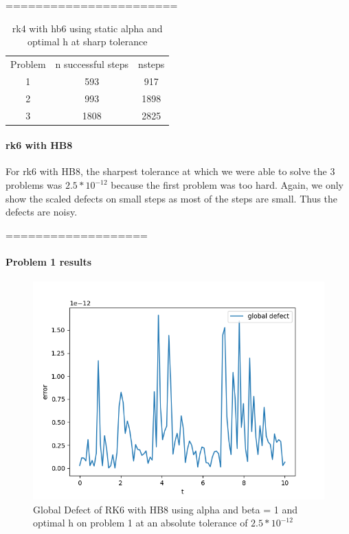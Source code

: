 \documentclass{article}
\begin{document}
=======================
\begin{table}[h]
\caption {rk4 with hb6 using static alpha and optimal h at sharp tolerance} \label{tab:rk4_with_hb6_sharp_tolerance}
\begin{center}
\begin{tabular}{ c c c } 
Problem & n successful steps      &       nsteps \\ 
1       & 593                     &        917              \\ 
2       & 993                     &        1898             \\
3       & 1808                    &        2825             \\
\end{tabular}
\end{center}
\end{table}	


\paragraph{rk6 with HB8}
For rk6 with HB8, the sharpest tolerance at which we were able to solve the 3 problems was $2.5*10^{-12}$ because the first problem was too hard. Again, we only show the scaled defects on small steps as most of the steps are small. Thus the defects are noisy.

===================
\paragraph{Problem 1 results}
\begin{figure}[H]
\centering
\includegraphics[width=0.7\linewidth]{./figures/sharp_tolerance_rk6_with_hb8_p1_global_defect}
\caption{Global Defect of RK6 with HB8 using alpha and beta = 1 and optimal h on problem 1 at an absolute tolerance of $2.5*10^{-12}$}
\label{fig:sharp_tolerance_rk6_with_hb8_p1_global_defect}
\end{figure}
\end{document}
